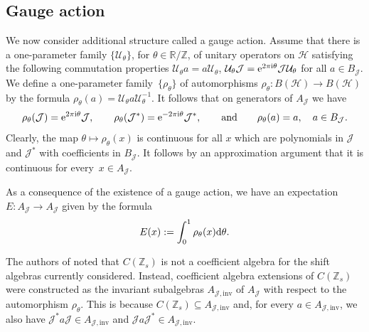 \documentclass[10pt,a4paper]{amsart}
\newcommand{\R}{{\mathbb R}}
\newcommand{\Z}{{\mathbb Z}}
\newcommand{\jcal}{{\mathcal J}}
\numberwithin{equation}{section}
\begin{document}
\subsection{Gauge action}
We now consider additional structure called a gauge action. Assume that there is a one-parameter family $\{\mathcal{U}_\theta\}$, for $\theta\in\R/\Z$, of unitary operators on $\mathcal{H}$ satisfying the following commutation properties
$\mathcal{U}_\theta a = a \mathcal{U}_\theta $, $ \mathcal{U}_\theta \mathcal{J} = {\rm e}^{2\pi {\rm i}\theta}\mathcal{J} \mathcal{U}_\theta
$
for all $a\in B_\jcal$.
We define a one-parameter family~$\{\rho_\theta\}$ of automorphisms $\rho_\theta\colon B(\mathcal{H})\to B(\mathcal{H})$ by the formula
$
\rho_\theta(a)=\mathcal{U}_\theta a \mathcal{U}_\theta^{-1}$.
It follows that on generators of $A_{\mathcal{J}}$ we have
\[
\rho_\theta(\mathcal{J})={\rm e}^{2\pi {\rm i}\theta}\mathcal{J}, \qquad\rho_\theta(\mathcal{J}^*)={\rm e}^{-2\pi {\rm i}\theta}\mathcal{J}^*,\qquad \text{and} \qquad\rho_\theta(a) = a,\quad a\in B_\jcal.
\]
Clearly, the map $\theta\mapsto \rho_\theta(x)$ is continuous for all $x$ which are polynomials in $\mathcal{J}$ and $\mathcal{J}^*$ with coefficients in $B_\jcal$. It follows by an approximation argument that it is continuous for every~${x\in A_{\mathcal{J}}}$.

As a consequence of the existence of a gauge action, we have an expectation
$E\colon A_\mathcal{J}\to A_\mathcal{J}$
given by the formula
\begin{equation}\label{expect_formula}
E(x):=\int_0^1 \rho_\theta(x) {\rm d}\theta.
\end{equation}

The authors of \cite{HKMP3} noted that $C(\Z_s)$ is not a coefficient algebra for the shift algebras currently considered. Instead, coefficient algebra extensions of $C(\Z_s)$ were constructed as the invariant subalgebras $A_{\mathcal{J},\textrm{inv}}$ of $A_\mathcal{J}$ with respect to the automorphism $\rho_\theta$.
This is because $C(\Z_s)\subseteq A_{\mathcal{J},\textrm{inv}}$ and, for every $a\in A_{\mathcal{J},\textrm{inv}}$, we also have
$
\mathcal{J}^*a\mathcal{J}\in A_{\mathcal{J},\textrm{inv}}$ and $ \mathcal{J}a\mathcal{J}^*\in A_{\mathcal{J},\textrm{inv}}$.
\end{document}
